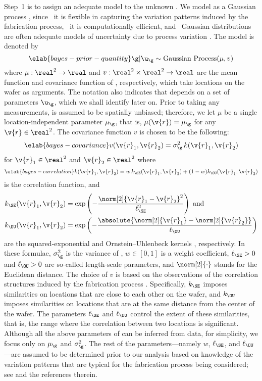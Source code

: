 Step~1 is to assign an adequate model to the unknown \g. We model \g as a
Gaussian process \cite{rasmussen2006}, since \one~it is flexible in capturing
the variation patterns induced by the fabrication process, \two~it is
computationally efficient, and \three~Gaussian distributions are often adequate
models of uncertainty due to process variation \cite{reda2009, srivastava2010,
juan2012}. The model is denoted by
\begin{equation} \elab{bayes-prior-quantity}
  \g | \u_\g \sim \mathrm{Gaussian\ Process}(\mu, v)
\end{equation}
where $\mu: \real^2 \to \real$ and $v: \real^2 \times \real^2 \to \real$ are the
mean function and covariance function of \g, respectively, which take locations
on the wafer as arguments. The notation also indicates that \g depends on a set
of parameters $\u_\g$, which we shall identify later on. Prior to taking any
measurements, \g is assumed to be spatially unbiased; therefore, we let $\mu$ be
a single location-independent parameter $\mu_\g$, that is, $\mu(\v{r}) = \mu_\g$
for any $\v{r} \in \real^2$. The covariance function $v$ is chosen to be the
following:
\begin{equation} \elab{bayes-covariance}
  v(\v{r}_1, \v{r}_2) = \sigma_\g^2 \, k(\v{r}_1, \v{r}_2)
\end{equation}
for $\v{r}_1 \in \real^2$ and $\v{r}_2 \in \real^2$ where
\begin{equation} \elab{bayes-correlation}
  k(\v{r}_1, \v{r}_2) = w \, k_\SE(\v{r}_1, \v{r}_2) + (1 - w) k_\OU(\v{r}_1, \v{r}_2)
\end{equation}
is the correlation function, and
\begin{align*}
  k_\SE(\v{r}_1, \v{r}_2) & = \exp\left(-\frac{\norm[2]{\v{r}_1 - \v{r}_2}^2}{\ell_\SE^2}\right) \text{ and} \\
  k_\OU(\v{r}_1, \v{r}_2) & = \exp\left(-\frac{\absolute{\norm[2]{\v{r}_1} - \norm[2]{\v{r}_2}}}{\ell_\OU}\right)
\end{align*}
are the squared-exponential and Ornstein--Uhlenbeck kernels
\cite{rasmussen2006}, respectively. In these formulae, $\sigma_\g^2$ is the
variance of \g, $w \in [0, 1]$ is a weight coefficient, $\ell_\SE > 0$ and
$\ell_\OU > 0$ are so-called length-scale parameters, and $\norm[2]{\cdot}$
stands for the Euclidean distance. The choice of $v$ is based on the
observations of the correlation structures induced by the fabrication process
\cite{chandrakasan2000, cheng2011}. Specifically, $k_\SE$ imposes similarities
on locations that are close to each other on the wafer, and $k_\OU$ imposes
similarities on locations that are at the same distance from the center of the
wafer. The parameters $\ell_\SE$ and $\ell_\OU$ control the extent of these
similarities, that is, the range where the correlation between two locations is
significant. Although all the above parameters of \g can be inferred from data,
for simplicity, we focus only on $\mu_\g$ and $\sigma_\g^2$. The rest of the
parameters---namely $w$, $\ell_\SE$, and $\ell_\OU$---are assumed to be
determined prior to our analysis based on knowledge of the variation patterns
that are typical for the fabrication process being considered; see
\cite{marzouk2009} and the references therein.

